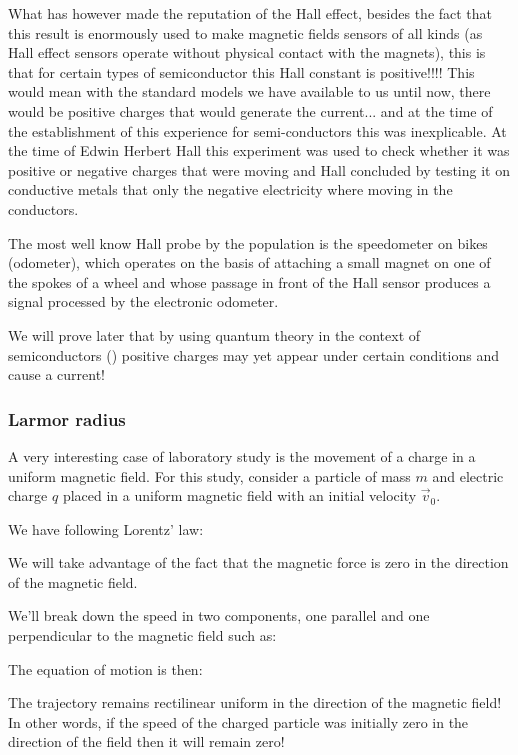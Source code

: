 	What has however made the reputation of the Hall effect, besides the fact that this result is enormously used to make magnetic fields sensors of all kinds (as Hall effect sensors operate without physical contact with the magnets), this is that for certain types of semiconductor this Hall constant is positive!!!! This would mean with the standard models we have available to us until now, there would be positive charges that would generate the current... and at the time of the establishment of this experience for semi-conductors this was inexplicable. At the time of  Edwin Herbert  Hall this experiment was used to check whether it was positive or negative charges that were moving and Hall concluded by testing it on conductive metals that only the negative electricity where moving in the conductors.
	\begin{tcolorbox}[title=Remark,colframe=black,arc=10pt]
	The most well know Hall probe by the population is the speedometer on bikes (odometer), which operates on the basis of attaching a small magnet on one of the spokes of a wheel and whose passage in front of the Hall sensor produces a signal processed by the electronic odometer.
	\end{tcolorbox}
	We will prove later that by using quantum theory in the context of semiconductors () positive charges may yet appear under certain conditions and cause a current!
	
	\subsubsection{Larmor radius}
	A very interesting case of laboratory study is the movement of a charge in a uniform magnetic field. For this study, consider a particle of mass $m$ and electric charge $q$ placed in a uniform magnetic field with an initial velocity $\vec{v}_0$.

	We have following Lorentz' law:
	
	We will take advantage of the fact that the magnetic force is zero in the direction of the magnetic field.

	We'll break down the speed in two components, one parallel and one perpendicular to the magnetic field such as:
	
	The equation of motion is then:
	
	The trajectory remains rectilinear uniform in the direction of the magnetic field! In other words, if the speed of the charged particle was initially zero in the direction of the field then it will remain zero!
	
